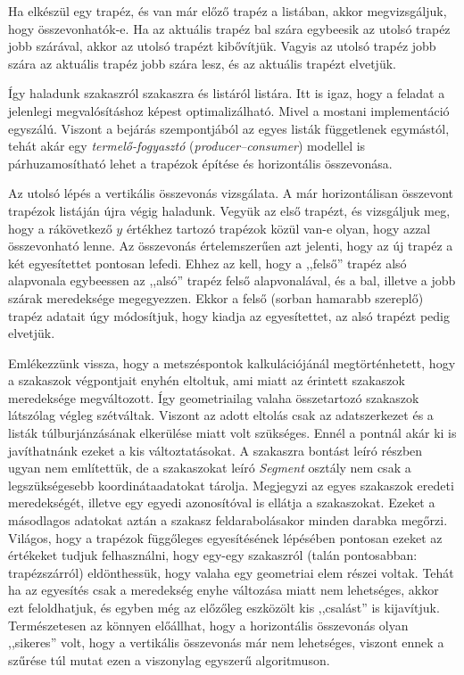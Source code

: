 \documentclass[12pt]{report}
\theoremstyle{definition}
\newcommand{\inenglish}[1]{\textsl{#1}}
\newcommand{\func}[1]{{\textsl{#1}}}
\begin{document}
Ha elkészül egy trapéz, és van már előző trapéz a listában, akkor
megvizsgáljuk, hogy összevonhatók-e. Ha az aktuális trapéz bal szára egybeesik
az utolsó trapéz jobb szárával, akkor az utolsó trapézt kibővítjük. Vagyis az
utolsó trapéz jobb szára az aktuális trapéz jobb szára lesz, és az aktuális
trapézt elvetjük.

Így haladunk szakaszról szakaszra és listáról listára. Itt is igaz, hogy a
feladat a jelenlegi megvalósításhoz képest optimalizálható. Mivel a mostani
implementáció egyszálú. Viszont a bejárás szempontjából az egyes listák
függetlenek egymástól, tehát akár egy \emph{termelő-fogyasztó}
(\inenglish{producer--consumer}) modellel is párhuzamosítható lehet a trapézok
építése és horizontális összevonása.

Az utolsó lépés a vertikális összevonás vizsgálata. A már horizontálisan
összevont trapézok listáján újra végig haladunk. Vegyük az első trapézt, és
vizsgáljuk meg, hogy a rákövetkező $y$ értékhez tartozó trapézok közül van-e
olyan, hogy azzal összevonható lenne. Az összevonás értelemszerűen azt jelenti,
hogy az új trapéz a két egyesítettet pontosan lefedi. Ehhez az kell, hogy a
,,felső'' trapéz alsó alapvonala egybeessen az ,,alsó'' trapéz felső
alapvonalával, és a bal, illetve a jobb szárak meredeksége megegyezzen. Ekkor a
felső (sorban hamarabb szereplő) trapéz adatait úgy módosítjuk, hogy kiadja az
egyesítettet, az alsó trapézt pedig elvetjük.

Emlékezzünk vissza, hogy a metszéspontok kalkulációjánál megtörténhetett, hogy
a szakaszok végpontjait enyhén eltoltuk, ami miatt az érintett szakaszok
meredeksége megváltozott. Így geometriailag valaha összetartozó szakaszok
látszólag végleg szétváltak. Viszont az adott eltolás csak az adatszerkezet és
a listák túlburjánzásának elkerülése miatt volt szükséges. Ennél a pontnál akár
ki is javíthatnánk ezeket a kis változtatásokat. A szakaszra bontást leíró
részben ugyan nem említettük, de a szakaszokat leíró \func{Segment} osztály nem
csak a legszükségesebb koordinátaadatokat tárolja. Megjegyzi az egyes szakaszok
eredeti meredekségét, illetve egy egyedi azonosítóval is ellátja a szakaszokat.
Ezeket a másodlagos adatokat aztán a szakasz feldarabolásakor minden darabka
megőrzi. Világos, hogy a trapézok függőleges egyesítésének lépésében pontosan
ezeket az értékeket tudjuk felhasználni, hogy egy-egy szakaszról (talán
pontosabban: trapézszárról) eldönthessük, hogy valaha egy geometriai elem részei
voltak. Tehát ha az egyesítés csak a meredekség enyhe változása miatt nem
lehetséges, akkor ezt feloldhatjuk, és egyben még az előzőleg eszközölt kis
,,csalást'' is kijavítjuk. Természetesen az könnyen előállhat, hogy a
horizontális összevonás olyan ,,sikeres'' volt, hogy a vertikális összevonás
már nem lehetséges, viszont ennek a szűrése túl mutat ezen a viszonylag
egyszerű algoritmuson.
\end{document}
